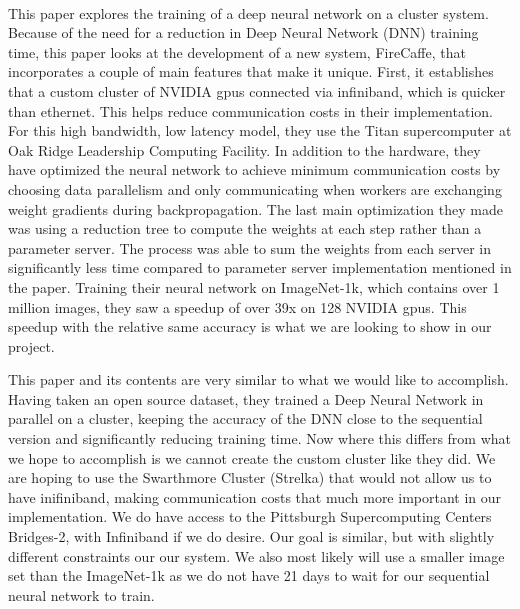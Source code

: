 \documentclass[11pt]{article}
\begin{document}
\

    This paper explores the training of a deep neural network on a cluster system. Because of the need for a reduction in Deep Neural Network (DNN) training time, this paper looks at the development of a new system, FireCaffe, that incorporates a couple of main features that make it unique. First, it establishes that a custom cluster of NVIDIA gpus connected via infiniband, which is quicker than ethernet. This helps reduce communication costs in their implementation. For this high bandwidth, low latency model, they use the Titan supercomputer at Oak Ridge Leadership Computing Facility. In addition to the hardware, they have optimized the neural network to achieve minimum communication costs by choosing data parallelism and only communicating when workers are exchanging weight gradients during backpropagation. The last main optimization they made was using a reduction tree to compute the weights at each step rather than a parameter server. The process was able to sum the weights from each server in significantly less time compared to parameter server implementation mentioned in the paper. Training their neural network on ImageNet-1k, which contains over 1 million images, they saw a speedup of over 39x on 128 NVIDIA gpus. This speedup with the relative same accuracy is what we are looking to show in our project.
    
    This paper and its contents are very similar to what we would like to accomplish. Having taken an open source dataset, they trained a Deep Neural Network in parallel on a cluster, keeping the accuracy of the DNN close to the sequential version and significantly reducing training time. Now where this differs from what we hope to accomplish is we cannot create the custom cluster like they did. We are hoping to use the Swarthmore Cluster (Strelka) that would not allow us to have inifiniband, making communication costs that much more important in our implementation. We do have access to the Pittsburgh Supercomputing Centers Bridges-2, with Infiniband if we do desire. Our goal is similar, but with slightly different constraints our our system. We also most likely will use a smaller image set than the ImageNet-1k as we do not have 21 days to wait for our sequential neural network to train. 
\end{document}
